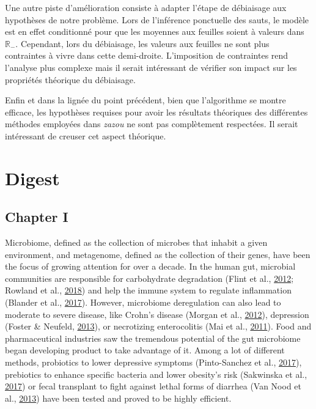 \documentclass[12pt,a4paper]{reedthesis}
\newcommand \RR {\mathbb{R}}
\theoremstyle{definition}
\theoremstyle{definition}
\theoremstyle{definition}
\theoremstyle{remark}
\begin{document}
Une autre piste d'amélioration consiste à adapter l'étape de débiaisage aux hypothèses de notre problème. Lors de l'inférence ponctuelle des sauts, le modèle est en effet conditionné pour que les moyennes aux feuilles soient à valeurs dans \(\RR_-\). Cependant, lors du débiaisage, les valeurs aux feuilles ne sont plus contraintes à vivre dans cette demi-droite. L'imposition de contraintes rend l'analyse plus complexe mais il serait intéressant de vérifier son impact sur les propriétés théorique du débiaisage.

Enfin et dans la lignée du point précédent, bien que l'algorithme se montre efficace, les hypothèses requises pour avoir les résultats théoriques des différentes méthodes employées dans \emph{zazou} ne sont pas complètement respectées. Il serait intéressant de creuser cet aspect théorique.

\hypertarget{digest}{%
\chapter*{Digest}\label{digest}}

\hypertarget{chapter-i}{%
\section*{Chapter I}\label{chapter-i}}

Microbiome, defined as the collection of microbes that inhabit a given environment, and metagenome, defined as the collection of their genes, have been the focus of growing attention for over a decade. In the human gut, microbial communities are responsible for carbohydrate degradation (Flint et al., \protect\hyperlink{ref-flint2012microbial}{2012}; Rowland et al., \protect\hyperlink{ref-rowland2018gut}{2018}) and help the immune system to regulate inflammation (Blander et al., \protect\hyperlink{ref-blander2017regulation}{2017}). However, microbiome deregulation can also lead to moderate to severe disease, like Crohn's disease (Morgan et al., \protect\hyperlink{ref-morgan2012dysfunction}{2012}), depression (Foster \& Neufeld, \protect\hyperlink{ref-foster2013gut}{2013}), or necrotizing enterocolitis (Mai et al., \protect\hyperlink{ref-mai2011fecal}{2011}). Food and pharmaceutical industries saw the tremendous potential of the gut microbiome began developing product to take advantage of it. Among a lot of different methods, probiotics to lower depressive symptoms (Pinto-Sanchez et al., \protect\hyperlink{ref-pinto2017probiotic}{2017}), prebiotics to enhance specific bacteria and lower obesity's risk (Sakwinska et al., \protect\hyperlink{ref-sakwinska2017prebiotics}{2017}) or fecal transplant to fight against lethal forms of diarrhea (Van Nood et al., \protect\hyperlink{ref-nood2013duodenal}{2013}) have been tested and proved to be highly efficient.
\end{document}
